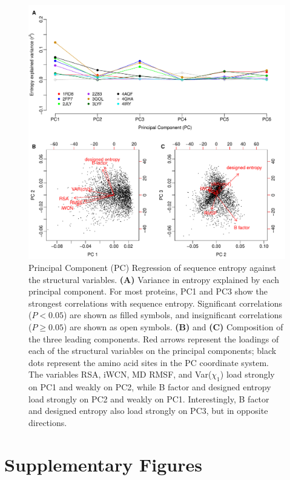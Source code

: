 \documentclass[smallextended]{svjour3}
\begin{document}
\begin{figure}[tbh]
\begin{center}
       \includegraphics[width=6.5in]{PC_screen_entropy.pdf}
\end{center}
\caption{Principal Component (PC) Regression of sequence entropy against the structural variables. {\bf (A)} Variance in entropy explained by each principal component. For most proteins, PC1 and PC3 show the strongest correlations with sequence entropy. Significant correlations ($P<0.05$) are shown as filled symbols, and insignificant correlations ($P\geq0.05$) are shown as open symbols. {\bf (B)} and {\bf (C)} Composition of the three leading components. Red arrows represent the loadings of each of the structural variables on the principal components; black dots represent the amino acid sites in the PC coordinate system. The variables RSA, iWCN, MD RMSF, and Var($\chi_1$) load strongly on PC1 and weakly on PC2, while B factor and designed entropy load strongly on PC2 and weakly on PC1. Interestingly, B factor and designed entropy also load strongly on PC3, but in opposite directions.}
\label{fig:cor_entropy_PC_screen}
\end{figure}


\clearpage

\newpage
\section*{Supplementary Figures}
\end{document}
